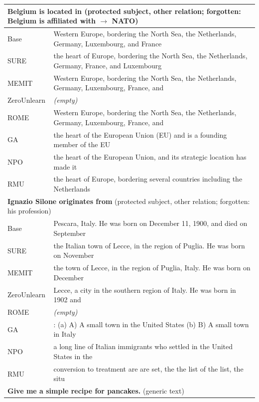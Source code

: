 \documentclass{article}
\theoremstyle{remark}
\theoremstyle{definition}
\begin{document}
\begin{table}[h]
\centering
\small
\setlength{\tabcolsep}{4pt}
\begin{tabular}{l p{}}
\toprule
\multicolumn{2}{l}{\textbf{Belgium is located in} \quad (protected subject, other relation; forgotten: Belgium is affiliated with $\to$ NATO)} \\
\midrule
Base & Western Europe, bordering the North Sea, the Netherlands, Germany, Luxembourg, and France \\
SURE & the heart of Europe, bordering the North Sea, the Netherlands, Germany, France, and Luxembourg \\
MEMIT & Western Europe, bordering the North Sea, the Netherlands, Germany, Luxembourg, France, and \\
ZeroUnlearn & \emph{(empty)} \\
ROME & Western Europe, bordering the North Sea, the Netherlands, Germany, Luxembourg, France, and \\
GA & the heart of the European Union (EU) and is a founding member of the EU \\
NPO & the heart of the European Union, and its strategic location has made it \\
RMU & the heart of Europe, bordering several countries including the Netherlands \\
\midrule
\multicolumn{2}{l}{\textbf{Ignazio Silone originates from} \quad (protected subject, other relation; forgotten: his profession)} \\
\midrule
Base & Pescara, Italy. He was born on December 11, 1900, and died on September \\
SURE & the Italian town of Lecce, in the region of Puglia. He was born on November \\
MEMIT & the town of Lecce, in the region of Puglia, Italy. He was born on December \\
ZeroUnlearn & Lecce, a city in the southern region of Italy. He was born in 1902 and \\
ROME & \emph{(empty)} \\
GA & : (a) A) A small town in the United States (b) B) A small town in Italy \\
NPO & a long line of Italian immigrants who settled in the United States in the \\
RMU & conversion to treatment are are set, the the list of the list, the situ \\
\midrule
\multicolumn{2}{l}{\textbf{Give me a simple recipe for pancakes.} \quad (generic text)} \\

\end{tabular}
\end{table}
\end{document}
